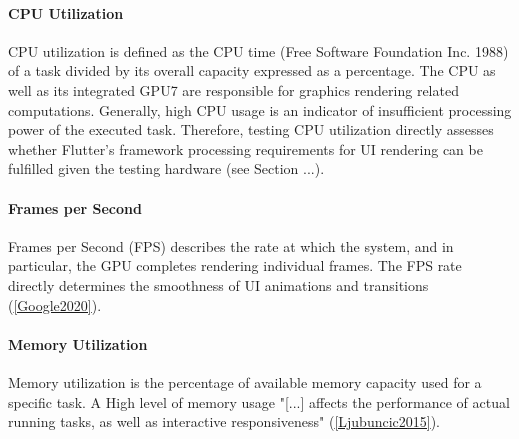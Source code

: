 \paragraph*{CPU Utilization}\hfill \break
CPU utilization is defined as the CPU time (Free Software Foundation Inc. 1988) of a task
divided by its overall capacity expressed as a percentage. The CPU as well as its integrated GPU7
are responsible for graphics rendering related computations. Generally, high CPU usage is an
indicator of insufficient processing power of the executed task. Therefore, testing CPU utilization
directly assesses whether Flutter’s framework processing requirements for UI rendering can be
fulfilled given the testing hardware (see Section ...).

\paragraph*{Frames per Second}\hfill \break
Frames per Second (FPS) describes the rate at which the system, and in particular, the GPU
completes rendering individual frames. The FPS rate directly determines the smoothness of UI
animations and transitions (\ref{Google2020}).

\paragraph*{Memory Utilization}\hfill \break
Memory utilization is the percentage of available memory capacity used for a specific task. A
High level of memory usage "[...] affects the performance of actual running tasks, as well as
interactive responsiveness" (\ref{Ljubuncic2015}).

